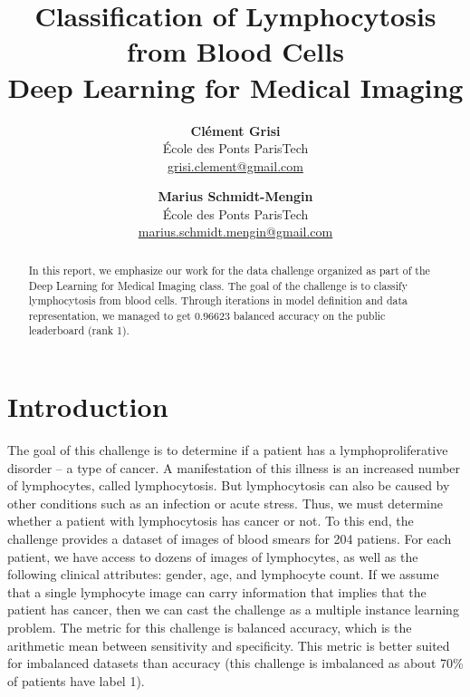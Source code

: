 \documentclass[final]{cvpr}
\begin{document}
	
	\title{Classification of Lymphocytosis from Blood Cells\\
		\vspace{1mm}
		\large \normalfont Deep Learning for Medical Imaging}
	
	\author{\textbf{Clément Grisi}\\
		École des Ponts ParisTech\\
		\small \url{grisi.clement@gmail.com}
	\and
	\textbf{Marius Schmidt-Mengin}\\
	École des Ponts ParisTech\\
	\small \url{marius.schmidt.mengin@gmail.com}
	}
	
	\maketitle
	
	\begin{abstract}
		In this report, we emphasize our work for the data challenge organized as part of the Deep Learning for Medical Imaging class. The goal of the challenge is to classify lymphocytosis from blood cells. Through iterations in model definition and data representation, we managed to get $0.96623$ balanced accuracy on the public leaderboard (rank 1).
	\end{abstract}
	
	\vspace{-3mm}
	
	\section{Introduction}
	
	The goal of this challenge is to determine if a patient has a lymphoproliferative disorder – a type of cancer. A manifestation of this illness is an increased number of lymphocytes, called lymphocytosis. But lymphocytosis can also be caused by other conditions such as an infection or acute stress. Thus, we must determine whether a patient with lymphocytosis has cancer or not. To this end, the challenge provides a dataset of images of blood smears for 204 patiens. For each patient, we have access to dozens of images of lymphocytes, as well as the following clinical attributes: gender, age, and lymphocyte count.
	If we assume that a single lymphocyte image can carry information that implies that the patient has cancer, then we can cast the challenge as a multiple instance learning problem.
	The metric for this challenge is balanced accuracy, which is the arithmetic mean between sensitivity and specificity. This metric is better suited for imbalanced datasets than accuracy 
	(this challenge is imbalanced as about 70\% of patients have label 1).
	
\end{document}
